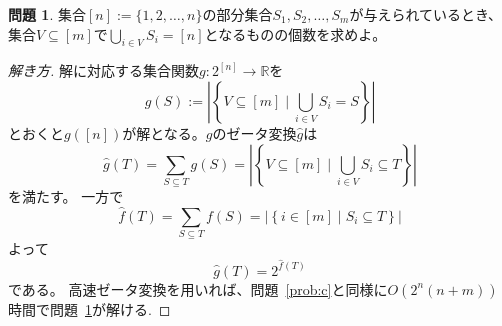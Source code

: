 \documentclass[a4paper,twoside,onecolumn,openany,article,10pt]{memoir}
\theoremstyle{definition}
\newtheorem{problem}{問題}
\theoremstyle{remark}
\begin{document}
\begin{problem}\label{prob:s}
集合$[n]:=\{1,2,\dotsc,n\}$の部分集合$S_1,S_2,\dotsc,S_m$が与えられているとき、
集合$V\subseteq [m]$で$\bigcup_{i\in V} S_{i}=[n]$となるものの個数を求めよ。
\end{problem}
\begin{proof}[解き方]
解に対応する集合関数$g\colon 2^{[n]}\to\mathbb{R}$を
\begin{equation*}
g(S) := \left|\left\{V\subseteq[m] \mid \bigcup_{i\in V} S_{i}=S\right\}\right|
\end{equation*}
とおくと$g([n])$が解となる。$g$のゼータ変換$\widehat{g}$は
\begin{equation*}
\widehat{g}(T) = \sum_{S\subseteq T}g(S) =
\left|\left\{V\subseteq[m] \mid \bigcup_{i\in V} S_{i}\subseteq T\right\}\right|
\end{equation*}
を満たす。
一方で
\begin{equation*}
\widehat{f}(T) = \sum_{S\subseteq T}f(S) =
\left|\left\{i\in[m] \mid S_i\subseteq T\right\}\right|
\end{equation*}
よって
\begin{equation*}
\widehat{g}(T) = 2^{\widehat{f}(T)}
\end{equation*}
である。
高速ゼータ変換を用いれば、問題~\ref{prob:c}と同様に$O(2^n(n+m))$時間で問題~\ref{prob:s}が解ける.
\end{proof}
\end{document}
